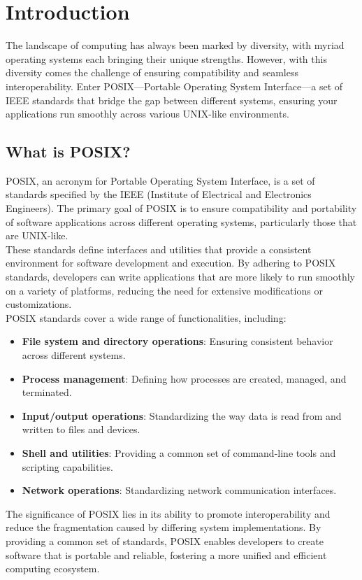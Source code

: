 \section{Introduction}

The landscape of computing has always been marked by diversity, with myriad operating systems each bringing their unique strengths. However, with this diversity comes the challenge of ensuring compatibility and seamless interoperability. Enter POSIX—Portable Operating System Interface—a set of IEEE standards that bridge the gap between different systems, ensuring your applications run smoothly across various UNIX-like environments.
\\
\subsection{What is POSIX?}

POSIX, an acronym for Portable Operating System Interface, is a set of standards specified by the IEEE (Institute of Electrical and Electronics Engineers). The primary goal of POSIX is to ensure compatibility and portability of software applications across different operating systems, particularly those that are UNIX-like.
\\
These standards define interfaces and utilities that provide a consistent environment for software development and execution. By adhering to POSIX standards, developers can write applications that are more likely to run smoothly on a variety of platforms, reducing the need for extensive modifications or customizations.
\\
POSIX standards cover a wide range of functionalities, including: \begin{itemize} \item \textbf{File system and directory operations}: Ensuring consistent behavior across different systems. \item \textbf{Process management}: Defining how processes are created, managed, and terminated. \item \textbf{Input/output operations}: Standardizing the way data is read from and written to files and devices. \item \textbf{Shell and utilities}: Providing a common set of command-line tools and scripting capabilities. \item \textbf{Network operations}: Standardizing network communication interfaces. \end{itemize}

The significance of POSIX lies in its ability to promote interoperability and reduce the fragmentation caused by differing system implementations. By providing a common set of standards, POSIX enables developers to create software that is portable and reliable, fostering a more unified and efficient computing ecosystem.
\\
